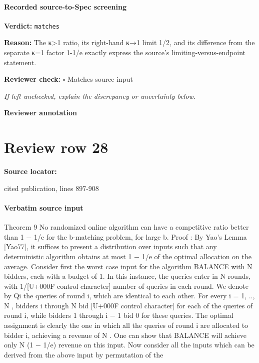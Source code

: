 \documentclass[10pt]{article}
\newcommand{\reviewerbox}{%
  \par\noindent\fbox{\parbox{0.96\linewidth}{\rule{0pt}{0.38in}}}\par
}
\newcommand{\reviewmatch}[1]{%
  \par\noindent\textbf{Reviewer check:} $\square$\; #1\par
  \noindent\emph{If left unchecked, explain the discrepancy or uncertainty below.}\par
}
\begin{document}
\paragraph{Recorded source-to-Spec screening}
\textbf{Verdict:} \texttt{matches}
\\
{\raggedright
\textbf{Reason:} The κ>1 ratio, its right-\allowbreak{}hand κ→1 limit 1/\allowbreak{}2, and its difference from the separate κ=1 factor 1-\allowbreak{}1/\allowbreak{}e exactly express the source's limiting-\allowbreak{}versus-\allowbreak{}endpoint statement.\allowbreak{}
\par}
\reviewmatch{Matches source input}
\noindent\textbf{Reviewer annotation}\par
\reviewerbox
\clearpage
\hypertarget{source-claim-3c4533b9f3b99b22}{}
\section*{Review row 28}
\textbf{Source locator:} {\footnotesize\raggedright cited publication, lines 897-\allowbreak{}908\par}
\paragraph{Verbatim source input}
\begin{ReviewVerbatim}
Theorem 9 No randomized online algorithm can have a competitive ratio better than 1 − 1/e
for the b-matching problem, for large b.
Proof : By Yao’s Lemma [Yao77], it suffices to present a distribution over inputs such that
any deterministic algorithm obtains at most 1 − 1/e of the optimal allocation on the average.
Consider first the worst case input for the algorithm BALANCE with N bidders, each with
a budget of 1. In this instance, the queries enter in N rounds, with 1/[U+000F control character] number of queries in
each round. We denote by Qi the queries of round i, which are identical to each other. For
every i = 1, .., N , bidders i through N bid [U+000F control character] for each of the queries of round i, while bidders 1
through i − 1 bid 0 for these queries. The optimal assignment is clearly the one in which all
the queries of round i are allocated to bidder i, achieving a revenue of N . One can show that
BALANCE will achieve only N (1 − 1/e) revenue on this input.
Now consider all the inputs which can be derived from the above input by permutation of the
\end{ReviewVerbatim}
\end{document}
